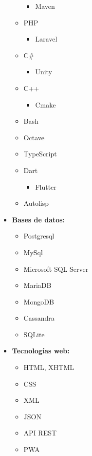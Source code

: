 \begin{multicols}{3}
\begin{itemize}
\begin{itemize}
\begin{itemize}
                \item Maven
            \end{itemize}
        \item PHP
            \begin{itemize}
                \item Laravel
            \end{itemize}
        \item C\#
            \begin{itemize}
                \item Unity
            \end{itemize}
        \item C++
            \begin{itemize}
                \item Cmake
            \end{itemize}
        \item Bash
        \item Octave
        \item TypeScript
        \item Dart
            \begin{itemize}
                \item Flutter
            \end{itemize}
        \item Autolisp
    \end{itemize}
\item
    \textbf{Bases de datos:}
    \begin{itemize}
        \item Postgresql
        \item MySql
        \item Microsoft SQL Server
        \item MariaDB
        \item MongoDB
        \item Cassandra
        \item SQLite
    \end{itemize}
\item
    \textbf{Tecnologías web:}
    \begin{itemize}
        \item HTML, XHTML
        \item CSS
        \item XML
        \item JSON
        \item API REST
        \item PWA

\end{itemize}
\end{itemize}
\end{multicols}

